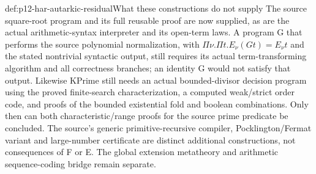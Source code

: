 \begin{proofboundary}{def:p12-har-autarkic-residual}{What these constructions do not supply}
The source square-root program and its full reusable proof are now supplied,
as are the actual arithmetic-syntax interpreter and its open-term laws.
A program G that performs the source polynomial normalization, with
\(\Pi\nu.\Pi t.E_\nu(Gt)=E_\nu t\) and the stated nontrivial
syntactic output, still requires its actual term-transforming algorithm
and all correctness branches; an identity G would not satisfy that output.
Likewise KPrime still needs an actual bounded-divisor decision program
using the proved finite-search characterization, a computed weak/strict
order code, and proofs of the bounded existential fold and boolean
combinations. Only then can both characteristic/range proofs for the
source prime predicate be concluded. The source's generic primitive-recursive compiler,
Pocklington/Fermat variant and large-number certificate are distinct
additional constructions, not consequences of F or E. The global
extension metatheory and arithmetic sequence-coding bridge remain separate.
\end{proofboundary}
